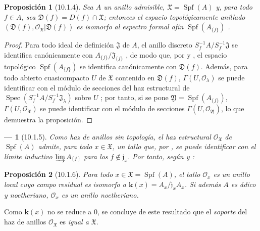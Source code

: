 \documentclass[oneside]{amsart}
\theoremstyle{ega-env-style}
\newtheorem*{env}{---}
\theoremstyle{ega-thm-env-style}
\newtheorem*{proposition}{Proposición}
\theoremstyle{ega-defn-env-style}
\newcommand{\oldpage}[2][]{{\marginnote{\normalfont{\textbf{#1}~|~#2}}}\ignorespaces}
\let\EGAOriginalLabel\label
\renewcommand{\label}[1]{\phantomsection\EGAOriginalLabel{#1}}
\begin{document}
\begin{proposition}[10.1.4]
\label{I.10.1.4}
Sea $A$ un anillo admisible, $\mathfrak{X}=\operatorname{Spf}(A)$ y, para todo $f\in A$, sea $\mathfrak{D}(f)=D(f)\cap\mathfrak{X}$; entonces el espacio topológicamente anillado $(\mathfrak{D}(f),\mathscr{O}_{\mathfrak{X}}|\mathfrak{D}(f))$ es isomorfo al espectro formal afín $\operatorname{Spf}(A_{\{f\}})$ .
\end{proposition}

\begin{proof}
Para todo ideal de definición $\mathfrak{J}$ de $A$, el anillo discreto $S_f^{-1}A/S_f^{-1}\mathfrak{J}$ se identifica canónicamente con $A_{\{f\}}/\mathfrak{J}_{\{f\}}$ , de modo que, por  y , el espacio topológico $\operatorname{Spf}(A_{\{f\}})$ se identifica canónicamente con $\mathfrak{D}(f)$.
Además, para todo abierto cuasicompacto $U$ de $\mathfrak{X}$ contenido en $\mathfrak{D}(f)$, $\Gamma(U,\mathscr{O}_\lambda)$ se puede identificar con el módulo de secciones del haz estructural de $\operatorname{Spec}(S_f^{-1}A/S_f^{-1}\mathfrak{J}_\lambda)$ sobre $U$ ; por tanto, si se pone $\mathfrak{Y}=\operatorname{Spf}(A_{\{f\}})$, $\Gamma(U,\mathscr{O}_{\mathfrak{X}})$ se puede identificar con el módulo de secciones $\Gamma(U,\mathscr{O}_{\mathfrak{Y}})$, lo que demuestra la proposición.
\end{proof}

\oldpage[I]{182}
\begin{env}[10.1.5]
\label{I.10.1.5}
Como haz de anillos \emph{sin topología}, el haz estructural $\mathscr{O}_{\mathfrak{X}}$ de $\operatorname{Spf}(A)$ admite, para todo $x\in\mathfrak{X}$, un tallo que, por , se puede identificar con el límite inductivo $\varinjlim A_{\{f\}}$ para los $f\notin\mathfrak{j}_x$. Por tanto, según  y :
\end{env}

\begin{proposition}[10.1.6]
\label{I.10.1.6}
Para todo $x\in\mathfrak{X}=\operatorname{Spf}(A)$, el tallo $\mathscr{O}_x$ es un anillo local cuyo campo residual es isomorfo a $\boldsymbol{k}(x)=A_x/\mathfrak{j}_xA_x$.
Si además $A$ es ádico y noetheriano, $\mathscr{O}_x$ es un anillo noetheriano.
\end{proposition}

Como $\boldsymbol{k}(x)$ no se reduce a 0, se concluye de este resultado que el \emph{soporte} del haz de anillos $\mathscr{O}_{\mathfrak{X}}$ es \emph{igual a $\mathfrak{X}$}.
\end{document}

